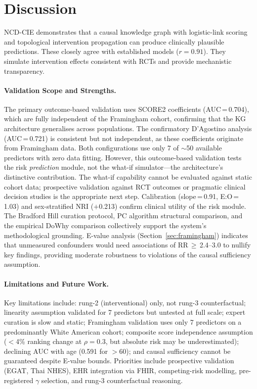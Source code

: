 \documentclass[runningheads]{llncs}
\begin{document}
\section{Discussion}\label{sec:discussion}

NCD-CIE demonstrates that a causal knowledge graph with logistic-link
scoring and topological intervention propagation can produce
clinically plausible predictions.
These closely agree with established models ($r = 0.91$).
They simulate intervention effects consistent with RCTs and provide
mechanistic transparency.

\paragraph{Validation Scope and Strengths.}
The primary outcome-based validation uses SCORE2 coefficients
(AUC\,=\,0.704), which are fully independent of the Framingham
cohort, confirming that the KG architecture generalises across
populations.
The confirmatory D'Agostino analysis (AUC\,=\,0.721) is consistent
but not independent, as these coefficients originate from
Framingham data.
Both configurations use only 7 of ${\sim}$50 available predictors
with zero data fitting.
However, this outcome-based validation tests the risk \emph{prediction}
module, not the what-if simulator---the architecture's distinctive
contribution.
The what-if capability cannot be evaluated against static cohort data;
prospective validation against RCT outcomes or pragmatic clinical
decision studies is the appropriate next step.
Calibration (slope\,=\,0.91, E:O\,=\,1.03) and sex-stratified
NRI ($+$0.213) confirm clinical utility of the risk module.
The Bradford Hill curation protocol, PC algorithm structural
comparison, and the empirical DoWhy comparison collectively
support the system's methodological grounding.
E-value analysis (Section~\ref{sec:framingham}) indicates that
unmeasured confounders would need associations of RR\,$\geq$\,2.4--3.0
to nullify key findings, providing moderate robustness to violations
of the causal sufficiency assumption.

\paragraph{Limitations and Future Work.}
Key limitations include: rung-2 (interventional) only, not rung-3
counterfactual; linearity assumption validated for 7 predictors
but untested at full scale; expert curation is slow and static;
Framingham validation uses only 7 predictors on a predominantly
White American cohort; composite score independence assumption
($<$4\% ranking change at $\rho=0.3$, but absolute risk may be
underestimated); declining AUC with age (0.591 for $>$60);
and causal sufficiency cannot be guaranteed despite E-value bounds.
Priorities include prospective validation (EGAT, Thai NHES),
EHR integration via FHIR, competing-risk modelling,
pre-registered $\gamma$ selection, and rung-3 counterfactual reasoning.
\end{document}
